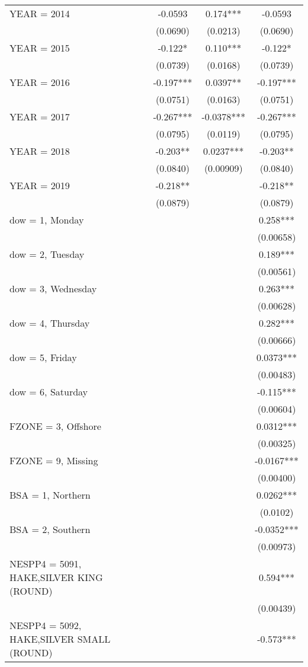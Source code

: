 \begin{tabular}{lccc}
YEAR = 2014 & -0.0593 & 0.174*** & -0.0593 \\
 & (0.0690) & (0.0213) & (0.0690) \\
YEAR = 2015 & -0.122* & 0.110*** & -0.122* \\
 & (0.0739) & (0.0168) & (0.0739) \\
YEAR = 2016 & -0.197*** & 0.0397** & -0.197*** \\
 & (0.0751) & (0.0163) & (0.0751) \\
YEAR = 2017 & -0.267*** & -0.0378*** & -0.267*** \\
 & (0.0795) & (0.0119) & (0.0795) \\
YEAR = 2018 & -0.203** & 0.0237*** & -0.203** \\
 & (0.0840) & (0.00909) & (0.0840) \\
YEAR = 2019 & -0.218** &  & -0.218** \\
 & (0.0879) &  & (0.0879) \\
dow = 1, Monday &  &  & 0.258*** \\
 &  &  & (0.00658) \\
dow = 2, Tuesday &  &  & 0.189*** \\
 &  &  & (0.00561) \\
dow = 3, Wednesday &  &  & 0.263*** \\
 &  &  & (0.00628) \\
dow = 4, Thursday &  &  & 0.282*** \\
 &  &  & (0.00666) \\
dow = 5, Friday &  &  & 0.0373*** \\
 &  &  & (0.00483) \\
dow = 6, Saturday &  &  & -0.115*** \\
 &  &  & (0.00604) \\
FZONE = 3, Offshore &  &  & 0.0312*** \\
 &  &  & (0.00325) \\
FZONE = 9, Missing &  &  & -0.0167*** \\
 &  &  & (0.00400) \\
BSA = 1, Northern &  &  & 0.0262*** \\
 &  &  & (0.0102) \\
BSA = 2, Southern &  &  & -0.0352*** \\
 &  &  & (0.00973) \\
NESPP4 = 5091, HAKE,SILVER KING (ROUND) &  &  & 0.594*** \\
 &  &  & (0.00439) \\
NESPP4 = 5092, HAKE,SILVER SMALL (ROUND) &  &  & -0.573*** \\

\end{tabular}
